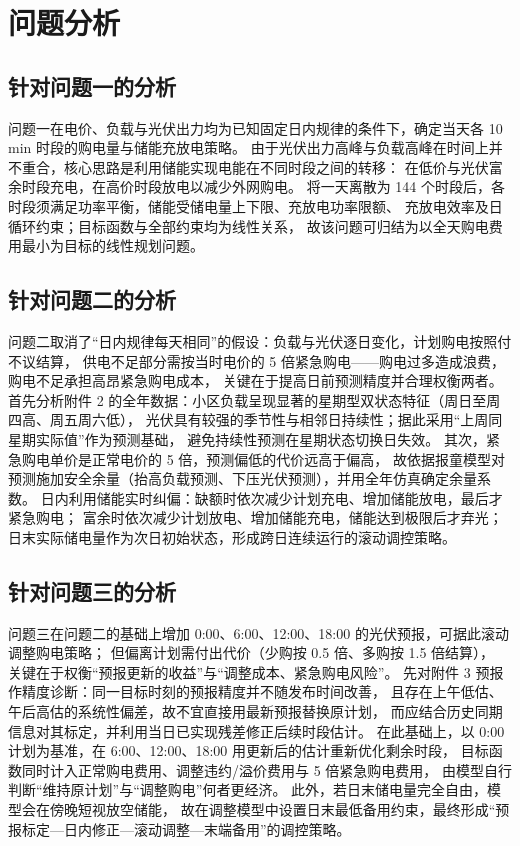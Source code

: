 \section{问题分析}

\subsection{针对问题一的分析}
问题一在电价、负载与光伏出力均为已知固定日内规律的条件下，确定当天各 10\,min 时段的购电量与储能充放电策略。
由于光伏出力高峰与负载高峰在时间上并不重合，核心思路是利用储能实现电能在不同时段之间的转移：
在低价与光伏富余时段充电，在高价时段放电以减少外网购电。
将一天离散为 144 个时段后，各时段须满足功率平衡，储能受储电量上下限、充放电功率限额、
充放电效率及日循环约束；目标函数与全部约束均为线性关系，
故该问题可归结为以全天购电费用最小为目标的线性规划问题。

\subsection{针对问题二的分析}
问题二取消了“日内规律每天相同”的假设：负载与光伏逐日变化，计划购电按照付不议结算，
供电不足部分需按当时电价的 5 倍紧急购电——购电过多造成浪费，购电不足承担高昂紧急购电成本，
关键在于提高日前预测精度并合理权衡两者。
首先分析附件 2 的全年数据：小区负载呈现显著的星期型双状态特征（周日至周四高、周五周六低），
光伏具有较强的季节性与相邻日持续性；据此采用“上周同星期实际值”作为预测基础\cite{fpp3}，
避免持续性预测在星期状态切换日失效。
其次，紧急购电单价是正常电价的 5 倍，预测偏低的代价远高于偏高，
故依据报童模型对预测施加安全余量（抬高负载预测、下压光伏预测）\cite{arrow1951}，并用全年仿真确定余量系数。
日内利用储能实时纠偏：缺额时依次减少计划充电、增加储能放电，最后才紧急购电；
富余时依次减少计划放电、增加储能充电，储能达到极限后才弃光；
日末实际储电量作为次日初始状态，形成跨日连续运行的滚动调控策略。

\subsection{针对问题三的分析}
问题三在问题二的基础上增加 0:00、6:00、12:00、18:00 的光伏预报，可据此滚动调整购电策略；
但偏离计划需付出代价（少购按 0.5 倍、多购按 1.5 倍结算），
关键在于权衡“预报更新的收益”与“调整成本、紧急购电风险”。
先对附件 3 预报作精度诊断：同一目标时刻的预报精度并不随发布时间改善，
且存在上午低估、午后高估的系统性偏差，故不宜直接用最新预报替换原计划，
而应结合历史同期信息对其标定，并利用当日已实现残差修正后续时段估计。
在此基础上，以 0:00 计划为基准，在 6:00、12:00、18:00 用更新后的估计重新优化剩余时段，
目标函数同时计入正常购电费用、调整违约/溢价费用与 5 倍紧急购电费用，
由模型自行判断“维持原计划”与“调整购电”何者更经济。
此外，若日末储电量完全自由，模型会在傍晚短视放空储能，
故在调整模型中设置日末最低备用约束，最终形成“预报标定—日内修正—滚动调整—末端备用”的调控策略。

